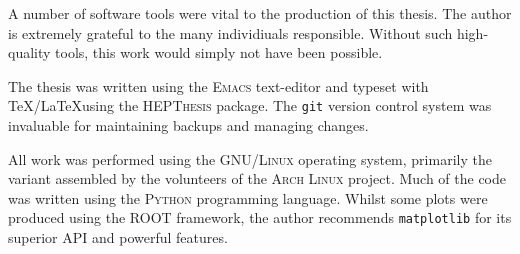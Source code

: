 


\begin{colophon}
  A number of software tools were vital to the production of this thesis. The
  author is extremely grateful to the many individiuals responsible. Without
  such high-quality tools, this work would simply not have been possible.

The thesis was written using the \textsc{Emacs} text-editor and typeset with
\TeX/\LaTeX using the \textsc{HEPThesis} package. The \texttt{git} version
control system was invaluable for maintaining backups and managing changes.

All work was performed using the \textsc{GNU/Linux} operating system, primarily
the variant assembled by the volunteers of the \textsc{Arch Linux} project. Much
of the code was written using the \textsc{Python} programming language. Whilst
some plots were produced using the \textsc{ROOT} framework, the author
recommends \texttt{matplotlib} for its superior API and powerful features.

\end{colophon}

